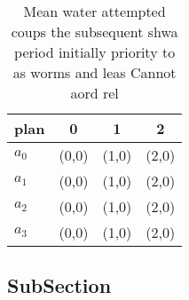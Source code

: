 \documentclass[a4paper]{article}
\begin{document}
\begin{table}
\begin{adjustbox}{width=0.5\columnwidth}
\begin{tabular}{|l|l|l|l|}
\hline
\textbf{plan} & \multicolumn{1}{c|}{\textbf{0}} & \multicolumn{1}{c|}{\textbf{1}} & \multicolumn{1}{c|}{\textbf{2}} \\ \hline
\textbf{$a_0$}  & (0,0) & (1,0) & (2,0) \\ \hline
\textbf{$a_1$}  & (0,0) & (1,0) & (2,0) \\ \hline
\textbf{$a_2$}  & (0,0) & (1,0) & (2,0) \\ \hline
\textbf{$a_3$}  & (0,0) & (1,0) & (2,0) \\ \hline
\end{tabular}
\end{adjustbox}
\caption{Mean water attempted coups the subsequent shwa period initially priority to as worms and leas Cannot aord rel
}
\end{table}

\subsection{SubSection}
\end{document}
